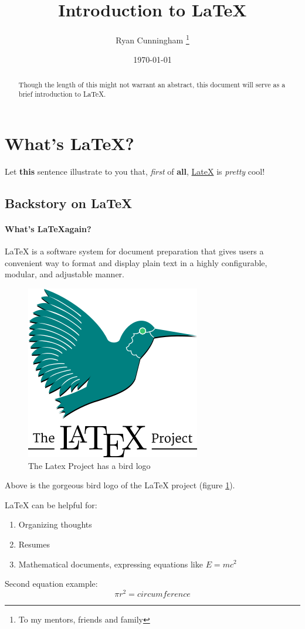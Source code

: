 \documentclass[12pt, letterpaper]{article}
\title{Introduction to LaTeX}
\author{Ryan Cunningham \thanks{To my mentors, friends and family}}
\date{\today}
\begin{document}
\maketitle

\begin{abstract}

Though the length of this might not warrant an abstract, this document will serve as a brief introduction to LaTeX.
	
\end{abstract}

\section{What's LaTeX?}


Let \textbf{this} sentence illustrate to you that, \textit{first} of \textbf{all}, \underline{LateX} is \emph{pretty} cool!

\subsection{Backstory on LaTeX}

\paragraph{What's \LaTeX \space again?}
LaTeX is a software system for document preparation that gives users a convenient way to format and display plain text in a highly configurable, modular, and adjustable manner.

\begin{figure}[h]
\centering
\includegraphics[width=.12\textwidth]{latex}
\caption{The Latex Project has a bird logo}
\label{birdlogo}
\end{figure}
Above is the gorgeous bird logo of the LaTeX project (figure \ref{birdlogo}). \newline


LaTeX can be helpful for: 
\begin{enumerate}
	\item{Organizing thoughts}	
	\item{Resumes}
	\item{Mathematical documents, expressing equations like $E=mc^2$} \newline

\end{enumerate} 
Second equation example:
	\[ \pi r^2 = circumference\]
\end{document}
